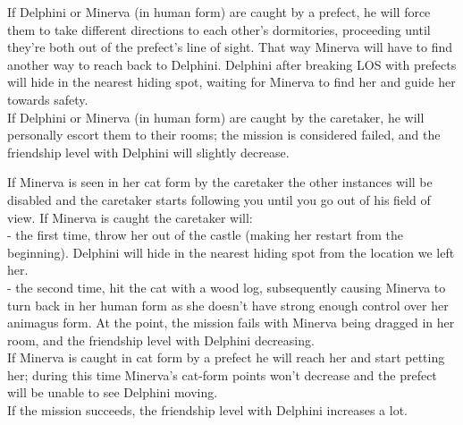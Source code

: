 If Delphini or Minerva (in human form) are caught by a prefect, he will force them to take different directions to each other's dormitories, proceeding until they're both out of the prefect's line of sight. That way Minerva will have to find another way to reach back to Delphini. Delphini after breaking LOS with prefects will hide in the nearest hiding spot, waiting for Minerva to find her and guide her towards safety.\\

If Delphini or Minerva (in human form) are caught by the caretaker, he will personally escort them to their rooms; the mission is considered failed, and the friendship level with Delphini will slightly decrease.\\


If Minerva is seen in her cat form by the caretaker the other instances will be disabled and the caretaker starts following you until you go out of his field of view.
If Minerva is caught the caretaker will: \\

- the first time, throw her out of the castle (making her restart from the beginning). Delphini will hide in the nearest hiding spot from the location we left her.\\
- the second time, hit the cat with a wood log, subsequently causing Minerva to turn back in her human form as she doesn't have strong enough control over her animagus form. At the point, the mission fails with Minerva being dragged in her room, and the friendship level with Delphini decreasing.\\

If Minerva is caught in cat form by a prefect he will reach her and start petting her; during this time Minerva's cat-form points won't decrease and the prefect will be unable to see Delphini moving.\\

If the mission succeeds, the friendship level with Delphini increases a lot.
\pagebreak


